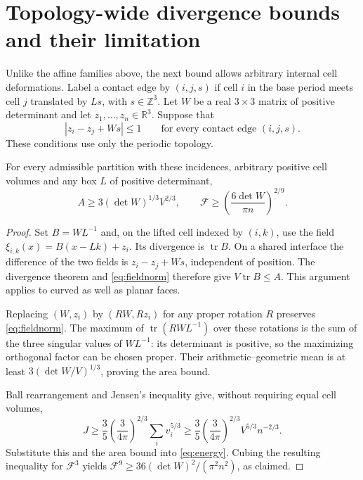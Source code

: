 \documentclass[11pt,a4paper]{report}
\newcommand{\DF}{\mathcal F}
\begin{document}
\section{Topology-wide divergence bounds and their limitation}

Unlike the affine families above, the next bound allows arbitrary internal
cell deformations. Label a contact edge by $(i,j,s)$ if cell $i$ in the
base period meets cell $j$ translated by $Ls$, with $s\in\mathbb Z^3$.
Let $W$ be a real $3\times3$ matrix of positive determinant and let
$z_1,\ldots,z_n\in\mathbb R^3$. Suppose that
\begin{equation}\label{eq:fieldnorm}
 |z_i-z_j+Ws|\leq1\qquad\text{for every contact edge }(i,j,s).
\end{equation}
These conditions use only the periodic topology.

\begin{theorem}\label{thm:topocalibration}
For every admissible partition with these incidences, arbitrary positive
cell volumes and any box $L$ of positive determinant,
\begin{equation}\label{eq:topocalibration}
 A\geq3(\det W)^{1/3}V^{2/3},\qquad
 \DF\geq\left(\frac{6\det W}{\pi n}\right)^{2/9}.
\end{equation}
\end{theorem}
\begin{proof}
Set $B=WL^{-1}$ and, on the lifted cell indexed by $(i,k)$, use the field
$\xi_{i,k}(x)=B(x-Lk)+z_i$. Its divergence is $\operatorname{tr}B$.
On a shared interface the difference of the two fields is
$z_i-z_j+Ws$, independent of position. The divergence theorem and
\eqref{eq:fieldnorm} therefore give $V\operatorname{tr}B\leq A$.
This argument applies to curved as well as planar faces.

Replacing $(W,z_i)$ by $(RW,Rz_i)$ for any proper rotation $R$ preserves
\eqref{eq:fieldnorm}. The maximum of $\operatorname{tr}(RWL^{-1})$
over these rotations is the sum of the three singular values of $WL^{-1}$:
its determinant is positive, so the maximizing orthogonal factor can be
chosen proper. Their arithmetic--geometric mean is at least
$3(\det W/V)^{1/3}$, proving the area bound.

Ball rearrangement and Jensen's inequality give, without requiring equal
cell volumes,
\[
 J\geq\frac35\left(\frac3{4\pi}\right)^{2/3}
       \sum_i v_i^{5/3}
 \geq\frac35\left(\frac3{4\pi}\right)^{2/3}V^{5/3}n^{-2/3}.
\]
Substitute this and the area bound into \eqref{eq:energy}. Cubing the
resulting inequality for $\DF^3$ yields
$\DF^9\geq36(\det W)^2/(\pi^2 n^2)$, as claimed.
\end{proof}
\end{document}
